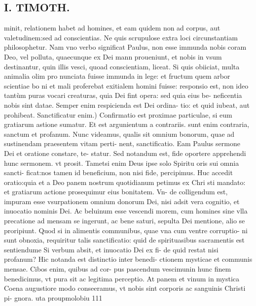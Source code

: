 \documentclass{article}
\begin{document}
\begin{pages}
\section*{I. TIMOTH. }
\marginpar{[ p.48 ]}\pstart minit, relationem habet ad homines, et eam quidem non ad corpus, aut valetudinem:sed ad conscientias. Ne quis scrupulose extra loci circunstantiam philosophetur. Nam vno verbo significat Paulus, non esse immunda nobis coram Deo, vel polluta, quaecunque ex Dei mann proueniunt, et nobis in vsum destinantur, quin illis vesci, quoad conscientiam, liceat. Si quis obiiciat, multa animalia olim pro nunciata fuisse immunda in lege: et fructum quem arbor scientiae bo ni et mali proferebat exitialem homini fuisse: responsio est, non ideo tantùm puras vocari creaturas, quia Dei fint opera: sed quia eius be- neficentia nobis sint datae. Semper enim respicienda est Dei ordina- tio: et quid iubeat, aut prohibeat.  \pend\pstart Sanctificatur enim.) Confirmatio est proximae particulae, si eum gratiarum astione sumatur. Et est argunientum a contrariis. sunt enim contraria, sanctum et profanum. Nunc videamus, qualis sit omnium bonorum, quae ad sustinendam praesentem vitam perti- nent, sanctificatio. Eam Paulus sermone Dei et oratione constare, te- statur. Sed notandum est, fide oportere apprehendi hunc sermonem. vt prosit. Tametsi enim Deus ipse solo Spiritu oris sui omnia sancti- ficat:nos tamen id beneficium, non nisi fide, percipimus. Huc accedit oratio:quia et a Deo panem nostrum quotidianum petimus ex Chri sti mandato: et gratiarum actione prosequimur eius bonitatem. Vn- de colligendum est, impuram esse vsurpationem omnium donorum Dei, nisi adsit vera cognitio, et inuocatio nominis Dei. Ac beluinum esse vescendi morem, cum homines sine vlla precatione ad mensam se ingerunt, ac bene saturi, sepulta Dei mentione, alio se proripiunt. Quod si in alimentis communibus, quae vna cum ventre corruptio- ni sunt obnoxia, requiritur talis sanctificatio: quid de spirituasibus sacramentis est sentiendume Si verbum absit, et inuocatio Dei ex fi- de quid restat nisi profanum? Hic notanda est distinctio inter benedi- ctionem mysticae et communis mensae. Cibos enim, quibus ad cor- pus pascendum vescimunin hunc finem benedicimus, vt pura sit ac legitima perceptio. At panem et vinum in mystica Coena augustiore modo conseeramus, vt nobis sint corporis ac sanguinis Christi pi- gnora.  uta proupmolobiu 111  \pend
{}
{}

\end{pages}
\end{document}
